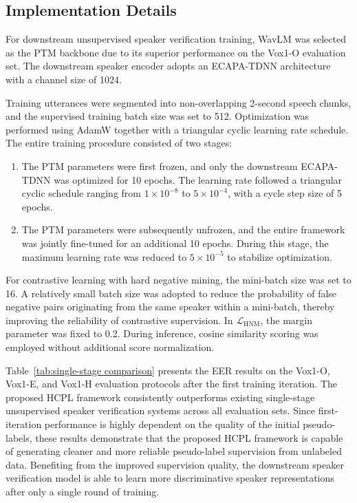 \documentclass[lettersize,journal]{IEEEtran}
\begin{document}
\subsection{Implementation Details}

For downstream unsupervised speaker verification training, WavLM was selected as the PTM backbone due to its superior performance on the Vox1-O evaluation set. The downstream speaker encoder adopts an ECAPA-TDNN architecture with a channel size of 1024.

Training utterances were segmented into non-overlapping 2-second speech chunks, and the supervised training batch size was set to 512. Optimization was performed using AdamW together with a triangular cyclic learning rate schedule. The entire training procedure consisted of two stages:

\begin{enumerate}
    \item The PTM parameters were first frozen, and only the downstream ECAPA-TDNN was optimized for 10 epochs. The learning rate followed a triangular cyclic schedule ranging from $1\times10^{-8}$ to $5\times10^{-4}$, with a cycle step size of 5 epochs.

    \item The PTM parameters were subsequently unfrozen, and the entire framework was jointly fine-tuned for an additional 10 epochs. During this stage, the maximum learning rate was reduced to $5\times10^{-5}$ to stabilize optimization.
\end{enumerate}

For contrastive learning with hard negative mining, the mini-batch size was set to 16. A relatively small batch size was adopted to reduce the probability of false negative pairs originating from the same speaker within a mini-batch, thereby improving the reliability of contrastive supervision. In $\mathcal{L}_{\mathrm{HNM}}$, the margin parameter was fixed to 0.2. During inference, cosine similarity scoring was employed without additional score normalization.

Table~\ref{tab:single-stage comparison} presents the EER results on the Vox1-O, Vox1-E, and Vox1-H evaluation protocols after the first training iteration. The proposed HCPL framework consistently outperforms existing single-stage unsupervised speaker verification systems across all evaluation sets. Since first-iteration performance is highly dependent on the quality of the initial pseudo-labels, these results demonstrate that the proposed HCPL framework is capable of generating cleaner and more reliable pseudo-label supervision from unlabeled data. Benefiting from the improved supervision quality, the downstream speaker verification model is able to learn more discriminative speaker representations after only a single round of training.
\end{document}
